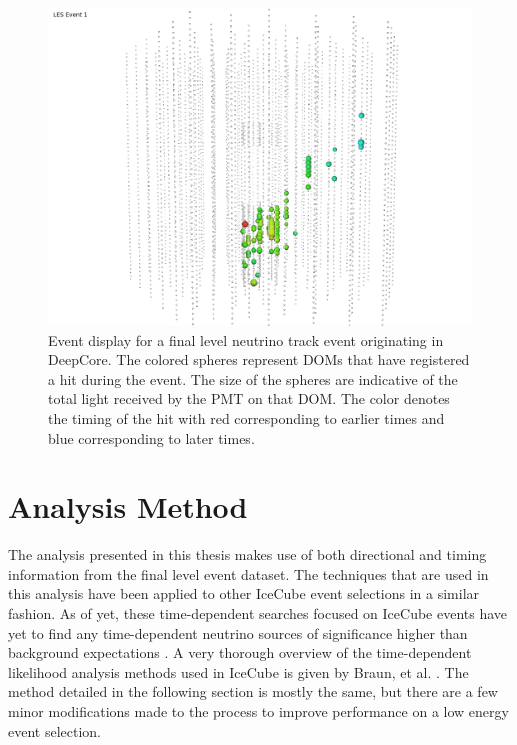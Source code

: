 \documentclass{gatech-thesis}
\begin{document}
\begin{figure}[ht]
  \begin{center}
    \includegraphics[width=1.0\textwidth,keepaspectratio]{LESEventForThesis.png}
  \end{center}
  \caption{Event display for a final level neutrino track event originating in DeepCore. The colored spheres represent DOMs that have registered a hit during the event. The size of the spheres are indicative of the total light received by the PMT on that DOM. The color denotes the timing of the hit with red corresponding to earlier times and blue corresponding to later times.}
  \label{fig:LESEventFinal}
\end{figure}


\chapter{Analysis Method}
The analysis presented in this thesis makes use of both directional and timing information from the final level event dataset. The techniques that are used in this analysis have been applied to other IceCube event selections in a similar fashion. As of yet, these time-dependent searches focused on IceCube events have yet to find any time-dependent neutrino sources of significance higher than background expectations \cite{}. A very thorough overview of the time-dependent likelihood analysis methods used in IceCube is given by Braun, et al. \cite{2010APh....33..175B}. The method detailed in the following section is mostly the same, but there are a few minor modifications made to the process to improve performance on a low energy event selection.
\end{document}
